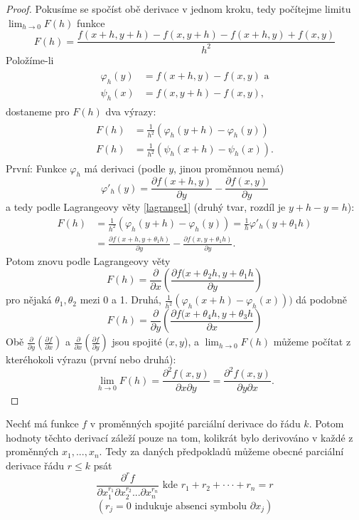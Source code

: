 \documentclass[../main.tex]{subfiles}
\begin{document}
\begin{proof}
	Pokusíme se spočíst obě derivace v jednom kroku, tedy počítejme limitu $\lim_{h\rightarrow 0} F(h)$ funkce
	\[F(h) = \frac{f(x+h,y+h) - f(x,y+h) - f(x+h,y) + f(x,y)}{h^2}\]
	Položíme-li 
	\begin{align*} 
		\begin{split}
			\varphi_h(y) & = f(x+h,y) - f(x,y)\text{ a}\\
			\psi_h(x) & = f(x,y+h) - f(x,y),
		\end{split}
	\end{align*}
	dostaneme pro $F(h)$ dva výrazy:
	\begin{align*} 
		\begin{split}
			F(h) & = \frac{1}{h^2} (\varphi_h(y+h) - \varphi_h(y))\\
			F(h) & = \frac{1}{h^2} (\psi_h(x+h)-\psi_h(x)).
		\end{split}
	\end{align*}
	První: Funkce $\varphi_h$ má derivaci (podle $y$, jinou proměnnou nemá)
	\[\varphi'_h(y)=\frac{\partial f(x+h,y)}{\partial y}-\frac{\partial f(x,y)}{\partial y}\]
	a tedy podle Lagrangeovy věty \ref{lagrange1} (druhý tvar, rozdíl je $y + h - y = h$):
	\begin{align*}
		F(h) & = \frac{1}{h^2}(\varphi_h(y+h)-\varphi_h(y)) = \frac{1}{h}\varphi'_h(y+\theta_1h)\\
		& = \frac{\partial f(x+h,y+\theta_1h)}{\partial y} -\frac{\partial f(x,y+\theta_1h)}{\partial y}.
	\end{align*}
	Potom znovu podle Lagrangeovy věty 
	\[F(h) = \frac{\partial }{\partial x}\left(\frac{\partial f(x+\theta_2h,y+\theta_1h}{\partial y}\right)\]
	pro nějaká $\theta_1,\theta_2$ mezi 0 a 1.
	Druhá, $\frac{1}{h^2}(\varphi_h(x+h) - \varphi_h(x)))$ dá podobně
	\[F(h) = \frac{\partial }{\partial y}\left(\frac{\partial f(x+\theta_4h,y + \theta_3h}{\partial x}\right)\]
	Obě $\frac{\partial }{\partial y}(\frac{\partial f}{\partial x})$ a $\frac{\partial }{\partial x}(\frac{\partial f}{\partial y})$ jsou spojité ($x,y$), a $\lim_{h\rightarrow 0} F(h)$ můžeme počítat z kteréhokoli výrazu (první nebo druhá):
	\[\lim_{h\rightarrow 0}F(h) = \frac{\partial ^2 f(x,y)}{\partial x \partial y} 
	                            = \frac{\partial ^2 f(x,y)}{\partial y \partial x}.\]
\end{proof}

\begin{consequence}
	Nechť má funkce $f$ v proměnných spojité parciální derivace do řádu $k$. Potom hodnoty těchto derivací
	záleží pouze na tom, kolikrát bylo derivováno v každé z proměnných $x_1, ... , x_n$.
	Tedy za daných předpokladů můžeme obecné parciální derivace řádu $r \leq k$ psát
	\[\frac{\partial ^r f}{\partial x^{r_1}_1 \partial x^{r_2}_2 ... \partial x_n^{r_n}} \text{ kde } r_1 + r_2 + \cdot \cdot \cdot + r_n = r \]
	\[(r_j = 0 \text{ indukuje absenci symbolu } \partial x_j)\]
\end{consequence}
\end{document}
